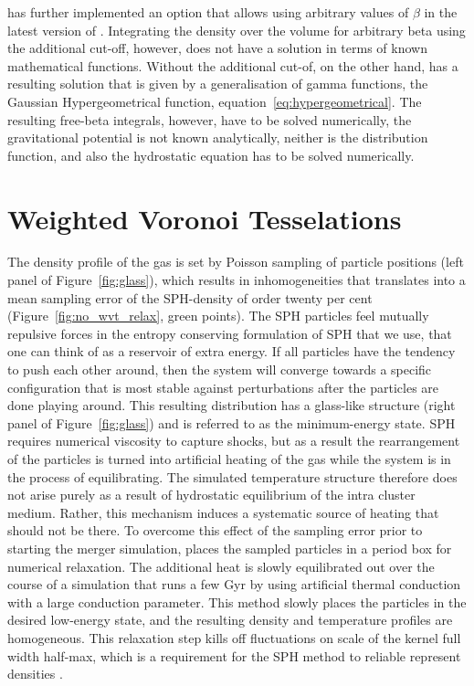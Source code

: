 \documentclass[MScProj_TLRH_ClusterEnergy.tex]{subfiles}
\begin{document}
\citet[in prep]{2016MNRAS.000.000D} has further implemented an option
that allows using arbitrary values of $\beta$ in the latest version of 
. Integrating the density over the volume for arbitrary beta 
using the additional cut-off, however, does not have a solution in terms of known
mathematical functions. Without the additional cut-of, on the other hand,
has a resulting solution that is given by a generalisation of gamma functions, 
the Gaussian Hypergeometrical function, equation~\eqref{eq:hypergeometrical}.
The resulting free-beta integrals, however, have to be solved numerically, the 
gravitational potential is not known analytically, neither is the distribution
function, and also the hydrostatic equation has to be solved numerically. 

\section*{Weighted Voronoi Tesselations}
The density profile of the gas is set by Poisson sampling of particle positions
(left panel of Figure~\ref{fig:glass}), which results in inhomogeneities
that translates into a mean sampling error of the SPH-density of order twenty 
per cent (Figure~\ref{fig:no_wvt_relax}, green points). The SPH particles feel 
mutually repulsive forces in the entropy conserving formulation of SPH that we 
use, that one can think of as a reservoir of extra energy. If all particles have 
the tendency to push each other around, then the system will converge towards a
specific configuration that is most stable against perturbations after the 
particles are done playing around. This resulting distribution has a glass-like
structure (right panel of Figure~\ref{fig:glass}) and is referred to as the 
minimum-energy state. SPH requires numerical viscosity to capture shocks, but as
a result the rearrangement of the particles is turned into artificial heating of
the gas while the system is in the process of equilibrating.
The simulated temperature structure therefore does not arise purely as a result 
of hydrostatic equilibrium of the intra cluster medium. Rather, this mechanism 
induces a systematic source of heating that should not be there. To overcome this
effect of the sampling error prior to starting the merger simulation, 
\citet{2014MNRAS.438.1971D} places the sampled particles in a period box for 
numerical relaxation. The additional heat is slowly equilibrated out over the
course of a simulation that runs a few Gyr by using artificial thermal conduction
\citep{2008JCoPh.22710040P} with a large conduction parameter. This method slowly 
places the particles in the desired low-energy state, and the resulting density
and temperature profiles are homogeneous. This relaxation step kills off 
fluctuations on scale of the kernel full width half-max, which is a requirement 
for the SPH method to reliable represent densities \citep{2012ASPC..453..249P}.
\end{document}
